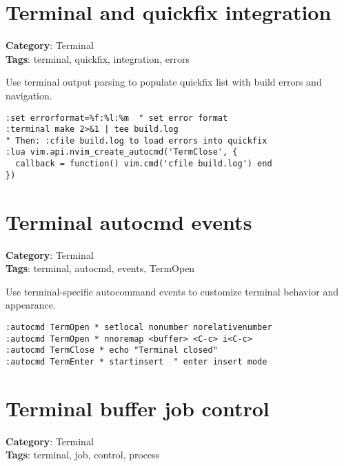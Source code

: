 {{{{{{{{{{\section{Terminal and quickfix integration}

\textbf{Category}: Terminal\\ \textbf{Tags}: terminal, quickfix, integration, errors
\vspace{0.5cm}

Use terminal output parsing to populate quickfix list with build errors and navigation.

\begin{Exa*}{}
\begin{Verbatim}[fontsize=\footnotesize, breaklines, breakanywhere]
:set errorformat=%f:%l:%m  " set error format
:terminal make 2>&1 | tee build.log
" Then: :cfile build.log to load errors into quickfix
:lua vim.api.nvim_create_autocmd('TermClose', {
  callback = function() vim.cmd('cfile build.log') end
})
\end{Verbatim}
\end{Exa*}

\section{Terminal autocmd events}

\textbf{Category}: Terminal\\ \textbf{Tags}: terminal, autocmd, events, TermOpen
\vspace{0.5cm}

Use terminal-specific autocommand events to customize terminal behavior and appearance.

\begin{Exa*}{}
\begin{Verbatim}[fontsize=\footnotesize, breaklines, breakanywhere]
:autocmd TermOpen * setlocal nonumber norelativenumber
:autocmd TermOpen * nnoremap <buffer> <C-c> i<C-c>
:autocmd TermClose * echo "Terminal closed"
:autocmd TermEnter * startinsert  " enter insert mode
\end{Verbatim}
\end{Exa*}

\section{Terminal buffer job control}

\textbf{Category}: Terminal\\ \textbf{Tags}: terminal, job, control, process
\vspace{0.5cm}

}}}}}}}}}}
